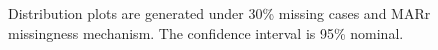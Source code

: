 \documentclass[12pt, fullpage, a4paper]{article}
\begin{document}
\newpage
\begin{figure}[b]
	\begin{center}
	\end{center}
	\caption{Distribution plots are generated under 30\% missing cases and MARr missingness mechanism. The confidence interval is 95\% nominal.}
	\label{fig2}
\end{figure}
\end{document}
